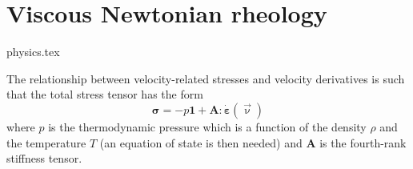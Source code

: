 \section{Viscous Newtonian rheology}
\begin{flushright} {\tiny {\color{gray} physics.tex}} \end{flushright}

The relationship between velocity-related stresses and
velocity derivatives is such that the total stress tensor has the form \cite{berc09}
\begin{equation}
{\bm \sigma} = -p {\bm 1} + {\bm A}:\dot{\bm \varepsilon}(\vec\upnu)
\end{equation}
where $p$ is the thermodynamic pressure which is a function of the density $\rho$ and the temperature $T$ (an equation of state is then needed)
and ${\bm A}$ is the fourth-rank stiffness tensor.

